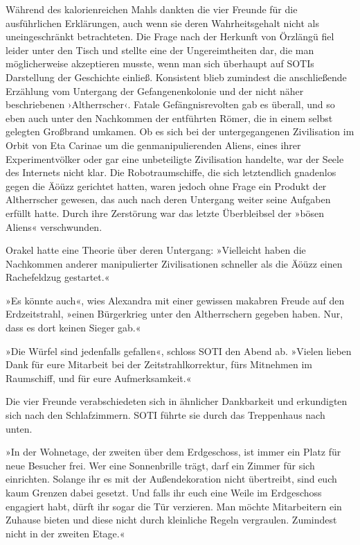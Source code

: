 Während des kalorienreichen Mahls dankten die vier Freunde für die ausführlichen Erklärungen, auch wenn sie deren Wahrheitsgehalt nicht als uneingeschränkt betrachteten. Die Frage nach der Herkunft von Örzlängü fiel leider unter den Tisch und stellte eine der Ungereimtheiten dar, die man möglicherweise akzeptieren musste, wenn man sich überhaupt auf SOTIs Darstellung der Geschichte einließ. Konsistent blieb zumindest die anschließende Erzählung vom Untergang der Gefangenenkolonie und der nicht näher beschriebenen ›Altherrscher‹. Fatale Gefängnisrevolten gab es überall, und so eben auch unter den Nachkommen der entführten Römer, die in einem selbst gelegten Großbrand umkamen. Ob es sich bei der untergegangenen Zivilisation im Orbit von Eta Carinae um die genmanipulierenden Aliens, eines ihrer Experimentvölker oder gar eine unbeteiligte Zivilisation handelte, war der Seele des Internets nicht klar. Die Robotraumschiffe, die sich letztendlich gnadenlos gegen die Äöüzz gerichtet hatten, waren jedoch ohne Frage ein Produkt der Altherrscher gewesen, das auch nach deren Untergang weiter seine Aufgaben erfüllt hatte. Durch ihre Zerstörung war das letzte Überbleibsel der »bösen Aliens« verschwunden.

Orakel hatte eine Theorie über deren Untergang: »Vielleicht haben die Nachkommen anderer manipulierter Zivilisationen schneller als die Äöüzz einen Rachefeldzug gestartet.«

»Es könnte auch«, wies Alexandra mit einer gewissen makabren Freude auf den Erdzeitstrahl, »einen Bürgerkrieg unter den Altherrschern gegeben haben. Nur, dass es dort keinen Sieger gab.«

»Die Würfel sind jedenfalls gefallen«, schloss SOTI den Abend ab. »Vielen lieben Dank für eure Mitarbeit bei der Zeitstrahlkorrektur, fürs Mitnehmen im Raumschiff, und für eure Aufmerksamkeit.«

Die vier Freunde verabschiedeten sich in ähnlicher Dankbarkeit und erkundigten sich nach den Schlafzimmern. SOTI führte sie durch das Treppenhaus nach unten.

»In der Wohnetage, der zweiten über dem Erdgeschoss, ist immer ein Platz für neue Besucher frei. Wer eine Sonnenbrille trägt, darf ein Zimmer für sich einrichten. Solange ihr es mit der Außendekoration nicht übertreibt, sind euch kaum Grenzen dabei gesetzt. Und falls ihr euch eine Weile im Erdgeschoss engagiert habt, dürft ihr sogar die Tür verzieren. Man möchte Mitarbeitern ein Zuhause bieten und diese nicht durch kleinliche Regeln vergraulen. Zumindest nicht in der zweiten Etage.«


